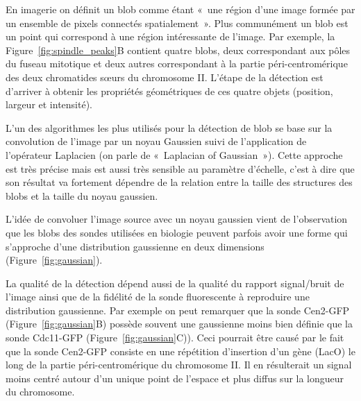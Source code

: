 \documentclass[12pt,a4paper,twoside,openright]{book}
\begin{document}
En imagerie on définit un blob comme étant «~une région d'une image
formée par un ensemble de pixels connectés spatialement~». Plus
communément un blob est un point qui correspond à une région
intéressante de l'image. Par exemple, la Figure~\ref{fig:spindle_peaks}B
contient quatre blobs, deux correspondant aux pôles du fuseau mitotique
et deux autres correspondant à la partie péri-centromérique des deux
chromatides sœurs du chromosome II. L'étape de la détection est
d'arriver à obtenir les propriétés géométriques de ces quatre objets
(position, largeur et intensité).

L'un des algorithmes les plus utilisés pour la détection de blob se base
sur la convolution de l'image par un noyau Gaussien suivi de
l'application de l'opérateur Laplacien (on parle de «~Laplacian of
Gaussian~»). Cette approche est très précise mais est aussi très
sensible au paramètre d'échelle, c'est à dire que son résultat va
fortement dépendre de la relation entre la taille des structures des
blobs et la taille du noyau gaussien.

L'idée de convoluer l'image source avec un noyau gaussien vient de
l'observation que les blobs des sondes utilisées en biologie peuvent
parfois avoir une forme qui s'approche d'une distribution gaussienne en
deux dimensions (Figure~\ref{fig:gaussian}).

La qualité de la détection dépend aussi de la qualité du rapport
signal/bruit de l'image ainsi que de la fidélité de la sonde
fluorescente à reproduire une distribution gaussienne. Par exemple on
peut remarquer que la sonde Cen2-GFP (Figure~\ref{fig:gaussian}B)
possède souvent une gaussienne moins bien définie que la sonde Cdc11-GFP
(Figure~\ref{fig:gaussian}C)). Ceci pourrait être causé par le fait que
la sonde Cen2-GFP consiste en une répétition d'insertion d'un gène
(LacO) le long de la partie péri-centromérique du chromosome II. Il en
résulterait un signal moins centré autour d'un unique point de l'espace
et plus diffus sur la longueur du chromosome.
\end{document}
